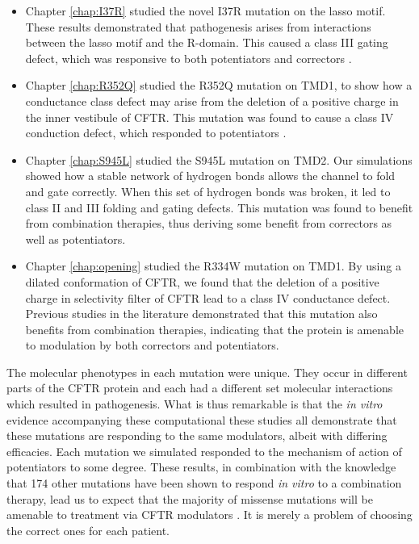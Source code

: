 
\begin{itemize}
	\item Chapter \ref{chap:I37R} studied the novel I37R mutation on the lasso motif. These results demonstrated that pathogenesis arises from interactions between the lasso motif and the R-domain. This caused a class III gating defect, which was responsive to both potentiators and correctors \cite{wong2022}. 
	\item Chapter \ref{chap:R352Q} studied the R352Q mutation on TMD1, to show how a conductance class defect may arise from the deletion of a positive charge in the inner vestibule of CFTR. This mutation was found to cause a class IV conduction defect, which responded to potentiators \cite{wong2022a}.
\item Chapter \ref{chap:S945L} studied the S945L mutation on TMD2. Our simulations showed how a stable network of hydrogen bonds allows the channel to fold and gate correctly. When this set of hydrogen bonds was broken, it led to class II and III folding and gating defects. This mutation was found to benefit from combination therapies, thus deriving some benefit from correctors as well as potentiators.  
\item Chapter \ref{chap:opening} studied the R334W mutation on TMD1. By using a dilated conformation of CFTR, we found that the deletion of a positive charge in selectivity filter of CFTR lead to a class IV conductance defect. Previous studies in the literature demonstrated that this mutation also benefits from combination therapies, indicating that the protein is amenable to modulation by both correctors and potentiators. 
\end{itemize}

The molecular phenotypes in each mutation were unique. They occur in different parts of the CFTR protein and each had a different set molecular interactions which resulted in pathogenesis. What is thus remarkable is that the \textit{in vitro} evidence accompanying these computational these studies all demonstrate that these mutations are responding to the same modulators, albeit with differing efficacies. Each mutation we simulated responded to the mechanism of action of potentiators to some degree. These results, in combination with the knowledge that 174 other mutations have been shown to respond \textit{in vitro} to a combination therapy, lead us to expect that the majority of missense mutations will be amenable to treatment via CFTR modulators \cite{trikafta_FDA_info}. It is merely a problem of choosing the correct ones for each patient.

